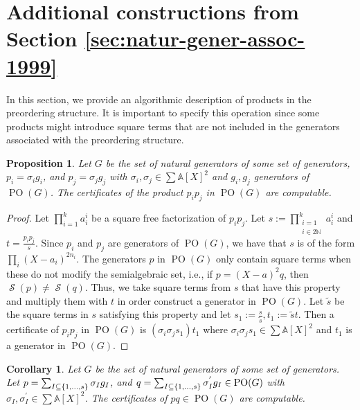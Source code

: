 \documentclass[preprint,12pt,authoryear]{elsarticle}
\newtheorem{corollary}[theorem]{Corollary}
\newtheorem{proposition}[theorem]{Proposition}
\newtheorem{proof}[theorem]{Proof}
\newcommand{\aX}{\mathbb{A}[X]}
\DeclarePairedDelimiter{\set}{\lbrace}{\rbrace}
\DeclareMathOperator{\semialgebraic}{\mathcal{S}}
\DeclareMathOperator{\PO}{PO}
\begin{document}
 \section{Additional constructions from Section \ref{sec:natur-gener-assoc-1999}} 

In this section, we provide an algorithmic description of products in the
preordering structure. It is important to specify this operation since some
products might introduce square terms that are not included in the generators
associated with the preordering structure.

\begin{proposition}
  \th\label{sec:addit-constr-from} Let $G$ be the set of natural generators of
  some set of generators, $p_i = \sigma_i g_i$, and $p_j = \sigma_j g_j$ with
  $\sigma_i, \sigma_j \in \sum{\aX}^2$ and $g_i, g_j$ generators of
  $\PO(G)$. The certificates of the product $p_i p_j$ in $\PO(G)$ are
  computable.
\end{proposition}

\begin{proof}
  Let $\prod_{i=1}^{k}{a_i^{i}}$ be a square free factorization of $p_i
  p_j$. Let $s := \prod_{\substack{i=1 \\ i \in 2\mathbb{N}}}^{k}{a_i^{i}}$ and
  $t = \frac{p_i p_j}{s}$. Since $p_i$ and $p_j$ are generators of $\PO(G)$,
  we have that $s$ is of the form $\prod_{i}^{}{(X - a_i)^{2 n_i}}$. The
 generators $p$ in $\PO(G)$ only contain square terms when these do not modify
  the semialgebraic set, i.e., if $p = (X - a)^{2} q$, then
  $\semialgebraic(p) \neq \semialgebraic(q)$. Thus, we take square
  terms from $s$ that have this property and multiply them with $t$ in order
  construct a generator in $\PO(G)$. Let $\tilde{s}$ be the square terms in
  $s$ satisfying this property and let
  $s_1 := \frac{s}{\tilde{s}}, t_1 := \tilde{s} t$. Then a certificate of
  $p_i p_j$ in $\PO(G)$ is $(\sigma_i \sigma_j s_1) t_1$ where
  $\sigma_i \sigma_j s_1 \in \sum{\aX}^2$ and $t_1$ is a generator in
  $\PO(G)$.
\end{proof}

\begin{corollary}
  \th\label{sec:addit-constr-from-corr}
  Let $G$ be the set of natural generators of some set of generators.
  Let $p = \sum_{I \subseteq \set{1, \dots, s}}^{}{\sigma_I g_I}$, and $q =
  \sum_{I \subseteq \set{1, \dots, s}}^{}{\sigma^{'}_I g_I} \in \PO(G)$ with
  $\sigma_I, \sigma^{'}_I \in \sum{\aX}^2$. The certificates of $p q
  \in \PO(G)$ are computable.
\end{corollary}
\end{document}
